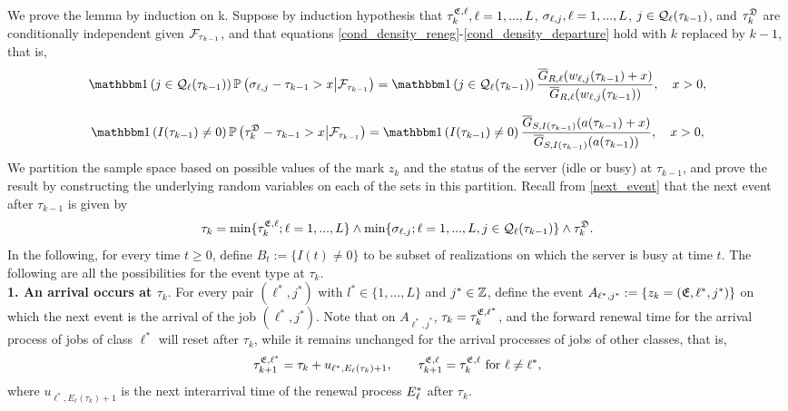 \documentclass{article}
\numberwithin{equation}{section}
\begin{document}
\begin{appendices}
We prove the lemma by induction on k. Suppose by induction hypothesis that $\tau^{\mathfrak{E},\ell}_{k},\ell=1,...,L$, $\sigma_{\ell,j}, \ell=1,...,L$, $j\in\mathcal{Q}_\ell(\tau_{k-1})$, and $\tau^{\mathfrak{D}}_{k}$ are conditionally independent given $\mathcal{F}_{\tau_{k-1}}$, and that equations \eqref{cond_density_reneg}-\eqref{cond_density_departure} hold with $k$ replaced by $k-1$, that is,
\begin{equation}\label{cond_density_reneg_k-1}
  \indic{j\in\inque_\ell(\tau_{k-1})}\Prob{\renegtime_{\ell,j}-\tau_{k-1}>x\big|\filt_{\tau_{k-1}}} =\indic{j\in\inque_\ell(\tau_{k-1})}\frac{\overline G_{R,\ell}(\waiting_{\ell,j}(\tau_{k-1})+x)} {\overline G_{R,\ell}(\waiting_{\ell,j}(\tau_{k-1}))}, \quad  x > 0,
\end{equation}

\begin{equation}\label{cond_density_departure_k-1}
    \indic{I(\tau_{k-1})\neq 0}\Prob{\nextdeparture_{k}-\tau_{k-1}>x\big|\filt_{\tau_{k-1}}} = \indic{I(\tau_{k-1})\neq 0}\frac{\overline G_{S,\class(\tau_{k-1})}(\age(\tau_{k-1})+x)}{\overline G_{S,\class(\tau_{k-1})}(\age(\tau_{k-1}))}, \quad  x > 0,
\end{equation}
We partition the sample space based on possible values of the mark $z_k$ and the status of the server (idle or busy) at $\tau_{k-1}$, and prove the result by constructing the underlying random variables on each of the sets in this partition. Recall from \eqref{next_event} that the next event after $\tau_{k-1}$ is given by
\begin{equation}\label{next_event_k}
  \tau_{k}= \min\{\tau^{\mathfrak{E},\ell}_{k};\ell=1,...,L\} \wedge \min\{\sigma_{\ell,j}; \ell=1,...,L,j\in\mathcal{Q}_\ell(\tau_{k-1}) \} \wedge \tau^{\mathfrak{D}}_{k}.
\end{equation}
In the following, for every time $t\geq0$, define $B_{t}:=\{I(t)\neq0\}$ to be subset of realizations on which the server is busy at time $t$. The following are all the possibilities for the event type at $\tau_k$.\\[1mm]

\noindent \textbf{1. An arrival occurs at $\tau_k$}. For every pair $(\ell^*,j^*)$ with $l^*\in\{1,...,L\}$ and $j^*\in\mathbb{Z}$, define the event $A_{\ell^*,j^*}:=\{z_k=(\mathfrak{E},\ell^*,j^*)\}$ on which the next event is the arrival of the job $(\ell^*,j^*)$. Note that on $A_{\ell^*,j^*}$, $\tau_k=\tau_k^{\mathfrak{E},\ell^*}$, and the forward renewal time for the arrival process of jobs of class $\ell^*$ will reset after $\tau_k$, while it remains unchanged for the arrival processes of jobs of other classes, that is,
\[
\tau_{k+1}^{\mathfrak{E},\ell^*}=\tau_k+u_{\ell^*,E_\ell(\tau_k)+1},\quad\quad  \tau_{k+1}^{\mathfrak{E},\ell}=\tau_k^{\mathfrak{E},\ell}\text{ for }\ell\neq\ell^*, 
\]
where $u_{\ell^*,E_\ell(\tau_k)+1}$ is the next interarrival time of the renewal process $E_\ell^*$ after $\tau_k$. 


\end{appendices}
\end{document}
